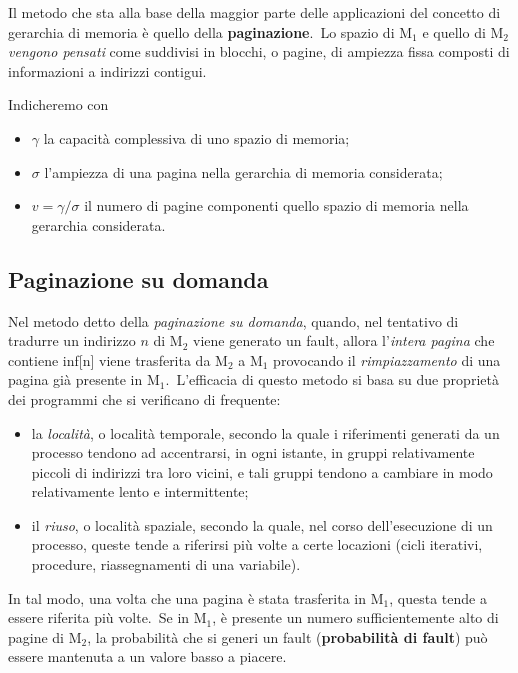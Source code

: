 Il metodo che sta alla base della maggior parte delle applicazioni del concetto di gerarchia di memoria è
quello della \textbf{paginazione}.\
Lo spazio di $\mathrm{M}_1$ e quello di $\mathrm{M}_2$ \textit{vengono pensati} come suddivisi in blocchi, o pagine, di ampiezza fissa composti di informazioni a indirizzi contigui.

Indicheremo con
\begin{itemize}
    \item $\gamma$ la capacità complessiva di uno spazio di memoria;
    \item $\sigma$ l'ampiezza di una pagina nella gerarchia di memoria considerata;
    \item $v = \gamma/\sigma$ il numero di pagine componenti quello spazio di memoria nella gerarchia considerata.
\end{itemize}

\subsection{Paginazione su domanda}

Nel metodo detto della \textit{paginazione su domanda}, quando, nel tentativo di tradurre un indirizzo $n$ di $\mathrm{M}_2$ viene generato un fault, allora l'\textit{intera pagina} che contiene inf[n] viene trasferita da $\mathrm{M}_2$ a $\mathrm{M}_1$ provocando il \textit{rimpiazzamento} di una pagina già presente in $\mathrm{M}_1$.\
L'efficacia di questo metodo si basa su due proprietà dei programmi che si verificano di frequente:

\begin{itemize}
    \item la \textit{località}, o località temporale, secondo la quale i riferimenti generati da un processo tendono ad accentrarsi, in ogni istante, in gruppi relativamente piccoli di indirizzi tra loro vicini, e tali gruppi tendono a cambiare in modo relativamente lento e intermittente;
    \item il \textit{riuso}, o località spaziale, secondo la quale, nel corso dell'esecuzione di un processo, queste tende a riferirsi più volte a certe locazioni (cicli iterativi, procedure, riassegnamenti di una variabile).
\end{itemize}

\noindent In tal modo, una volta che una pagina è stata trasferita in $\mathrm{M}_1$, questa tende a essere riferita più volte.\
Se in $\mathrm{M}_1$, è presente un numero sufficientemente alto di pagine di $\mathrm{M}_2$, la probabilità che si generi un fault (\textbf{probabilità di fault}) può essere mantenuta a un valore basso a piacere.

